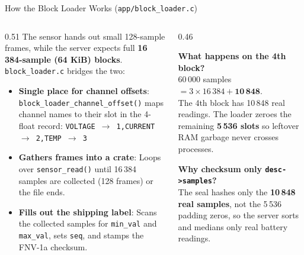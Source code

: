 \begin{frame}{How the Block Loader Works (\texttt{app/block\_loader.c})}
  \begin{columns}[t, onlytextwidth]
    \begin{column}{0.51\textwidth}
      \smalltext\compactitem
      The sensor hands out small 128-sample frames, while the server expects full \textbf{16\,384-sample (64 KiB) blocks}. \texttt{block\_loader.c} bridges the two:
      \begin{itemize}
        \item \textbf{Single place for channel offsets}: \texttt{block\_loader\_channel\_offset()} maps channel names to their slot in the 4-float record:
        \vskip0.5mm
        {\scriptsize \texttt{VOLTAGE $\rightarrow$ 1,\quad CURRENT $\rightarrow$ 2,\quad TEMP $\rightarrow$ 3}}
        \item \textbf{Gathers frames into a crate}: Loops over \texttt{sensor\_read()} until 16\,384 samples are collected (128 frames) or the file ends.
        \item \textbf{Fills out the shipping label}: Scans the collected samples for \texttt{min\_val} and \texttt{max\_val}, sets \texttt{seq}, and stamps the FNV-1a checksum.
      \end{itemize}
    \end{column}
    \begin{column}{0.46\textwidth}
      \smalltext\compactitem
      \begin{highlight}
        \textbf{What happens on the 4th block?} \\
        60\,000 samples $= 3 \times 16\,384 + \mathbf{10\,848}$. \\
        The 4th block has 10\,848 real readings. The loader zeroes the remaining \textbf{5\,536 slots} so leftover RAM garbage never crosses processes.
      \end{highlight}
      \vskip0.5mm
      \begin{tech}
        \textbf{Why checksum only \texttt{desc->samples}?} \\
        The seal hashes only the \textbf{10\,848 real samples}, not the 5\,536 padding zeros, so the server sorts and medians only real battery readings.
      \end{tech}
    \end{column}
  \end{columns}
\end{frame}

